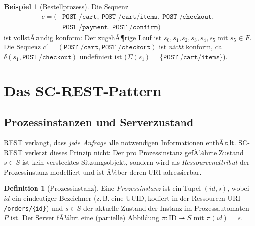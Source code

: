 ﻿\documentclass[a4paper,12pt]{article}
\theoremstyle{definition}
\newtheorem{definition}{Definition}
\newtheorem{beispiel}{Beispiel}
\begin{document}
\begin{beispiel}[Bestellprozess]
	Die Sequenz
	\[
		\begin{aligned}
			c = (&\texttt{POST /cart},\ \texttt{POST /cart/items},\ \texttt{POST /checkout},\\
			     &\texttt{POST /payment},\ \texttt{POST /confirm})
		\end{aligned}
	\]
	ist vollstÃ¤ndig konform: Der zugehÃ¶rige Lauf ist $s_0, s_1, s_2, s_3, s_4, s_5$ mit
	$s_5 \in F$. Die Sequenz $c' = (\texttt{POST /cart}, \texttt{POST /checkout})$ ist
	\emph{nicht} konform, da $\delta(s_1, \texttt{POST /checkout})$ undefiniert ist
	($\Sigma(s_1) = \{\texttt{POST /cart/items}\}$).
\end{beispiel}

\section{Das SC-REST-Pattern}
\label{sec:pattern}

\subsection{Prozessinstanzen und Serverzustand}

REST verlangt, dass \emph{jede Anfrage} alle notwendigen Informationen enthÃ¤lt. SC-REST
verletzt dieses Prinzip nicht: Der pro Prozessinstanz gefÃ¼hrte Zustand $s \in S$ ist kein
verstecktes Sitzungsobjekt, sondern wird als \emph{Ressourcenattribut} der Prozessinstanz
modelliert und ist Ã¼ber deren URI adressierbar.

\begin{definition}[Prozessinstanz]
	\label{def:prozessinstanz}
	Eine \emph{Prozessinstanz} ist ein Tupel $(id, s)$, wobei $id$ ein eindeutiger
	Bezeichner (z.\,B. eine UUID, kodiert in der Ressourcen-URI
	\texttt{/orders/\{id\}}) und $s \in S$ der aktuelle Zustand der Instanz im
	Prozessautomaten $P$ ist. Der Server fÃ¼hrt eine (partielle) Abbildung
	$\pi: \text{ID} \rightharpoonup S$ mit $\pi(id) = s$.
\end{definition}
\end{document}
